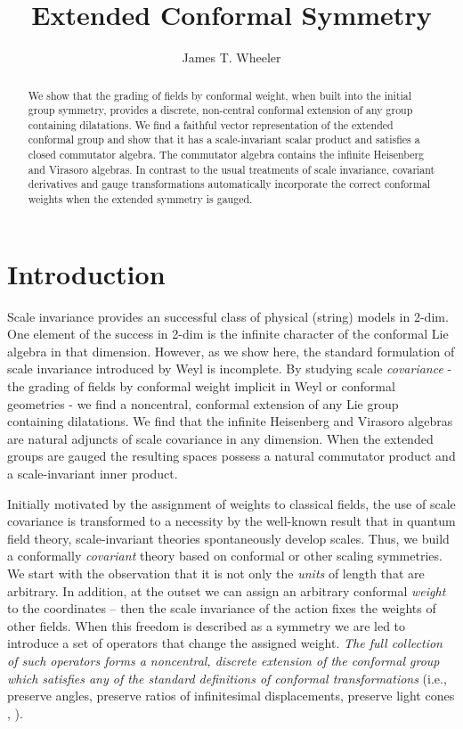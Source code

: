 \documentclass[a4paper,12pt]{article}
\begin{document}
\author{James T. Wheeler}
\title{Extended Conformal Symmetry}
\maketitle

\begin{abstract}
We show that the grading of fields by conformal weight, when built into the
initial group symmetry, provides a discrete, non-central conformal extension
of any group containing dilatations. We find a faithful vector
representation of the extended conformal group and show that it has a
scale-invariant scalar product and satisfies a closed commutator algebra.
The commutator algebra contains the infinite Heisenberg and Virasoro
algebras. In contrast to the usual treatments of scale invariance, covariant derivatives and gauge transformations automatically incorporate the
correct conformal weights when the extended symmetry is gauged.
\end{abstract}

\section{Introduction}

Scale invariance provides an successful class of physical (string) models
in 2-dim. One element of the success in 2-dim is the infinite character of
the conformal Lie algebra in that dimension. However, as we show here, the
standard formulation of scale invariance introduced by Weyl \cite{Weyl} is
incomplete. By studying scale \textit{covariance} - the grading of fields by
conformal weight implicit in Weyl or conformal geometries - we find a
noncentral, conformal extension of any Lie group containing dilatations. We
find that the infinite Heisenberg and Virasoro algebras are natural adjuncts
of scale covariance in any dimension. When the extended groups are gauged
the resulting spaces possess a natural commutator product and a
scale-invariant inner product.

Initially motivated by the assignment of weights to classical fields, the
use of scale covariance is transformed to a necessity by the well-known
result that in quantum field theory, scale-invariant theories spontaneously
develop scales. Thus, we build a conformally \textit{covariant} theory based on conformal
or other scaling symmetries. We start with the observation that it is not
only the \textit{units} of length that are arbitrary. In addition, at the
outset we can assign an arbitrary conformal \textit{weight} to the
coordinates -- then the scale invariance of the action fixes the weights of
other fields. When this freedom is described as a symmetry we are led to
introduce a set of operators that change the assigned weight. \textit{The
full collection of such operators forms a noncentral, discrete extension of
the conformal group which satisfies any of the standard definitions of
conformal transformations} (i.e., preserve angles, preserve ratios of
infinitesimal displacements, preserve light cones \cite{Barut}, \cite
{Hughston and Hurd}).
\end{document}
